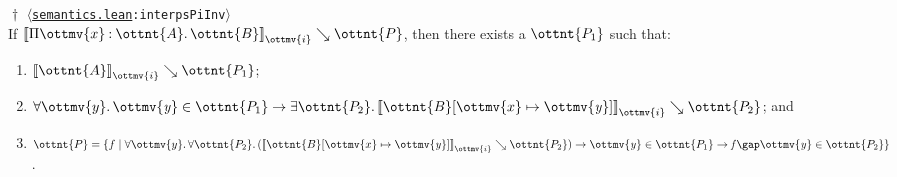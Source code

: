 \documentclass[a4paper,UKenglish,cleveref,autoref,thm-restate]{lipics-v2021}
\newcommand{\repo}{https://github.com/ionathanch/TTBFL}
\newcommand{\thmref}[2]{%
  $\langle$\href{\repo/tree/main/src/#1}{\texttt{#1}}\texttt{:#2}$\rangle$%
}
\begin{document}
\begin{lemma}$\!\!{\dagger}$ \thmref{semantics.lean}{interpsPiInv} \label{lem:lr:inv-pi} \\
  If $ \mathopen{\llbracket}   \Pi  \ottmv{x}  \mathbin{:}  \ottnt{A}  \mathpunct{.}  \ottnt{B}   \mathclose{\rrbracket}_{ \ottmv{i} } \searrow  \ottnt{P} $,
  then there exists a $\ottnt{P_{{\mathrm{1}}}}$ such that:
  \begin{enumerate}[topsep=0pt]
    \item \label{lem:inv-pi:goal:A} $ \mathopen{\llbracket}  \ottnt{A}  \mathclose{\rrbracket}_{ \ottmv{i} } \searrow  \ottnt{P_{{\mathrm{1}}}} $;
    \item \label{lem:inv-pi:goal:B} $   \forall  \ottmv{y}  \mathpunct{.}   \mathit{ \ottmv{y} }    \in  \ottnt{P_{{\mathrm{1}}}}   \to   \exists  \ottnt{P_{{\mathrm{2}}}}  \mathpunct{.}   \mathopen{\llbracket}   \ottnt{B} [  \ottmv{x}  \mapsto   \mathit{ \ottmv{y} }   ]   \mathclose{\rrbracket}_{ \ottmv{i} } \searrow  \ottnt{P_{{\mathrm{2}}}}   $; and
    \item \label{lem:inv-pi:goal:P} $\ottnt{P} =  \lbrace  f  \mid   \forall  \ottmv{y}  \mathpunct{.}     \forall  \ottnt{P_{{\mathrm{2}}}}  \mathpunct{.}   (  \mathopen{\llbracket}   \ottnt{B} [  \ottmv{x}  \mapsto   \mathit{ \ottmv{y} }   ]   \mathclose{\rrbracket}_{ \ottmv{i} } \searrow  \ottnt{P_{{\mathrm{2}}}}  )    \to    \mathit{ \ottmv{y} }   \in  \ottnt{P_{{\mathrm{1}}}}    \to     \mathit{ f }   \gap   \mathit{ \ottmv{y} }    \in  \ottnt{P_{{\mathrm{2}}}}     \rbrace $.
  \end{enumerate}
\end{lemma}
\end{document}
